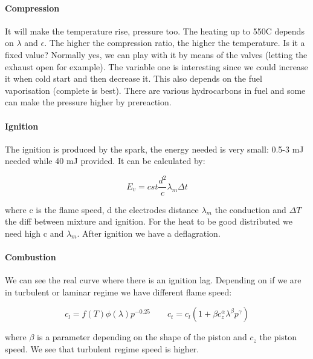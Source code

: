 \paragraph{Compression}
	It will make the temperature rise, pressure too. The heating up to 550\degres C depends on $\lambda$ and $\epsilon$. The higher the compression ratio, the higher the temperature. Is it a fixed value? Normally yes, we can play with it by means of the valves (letting the exhaust open for example). The variable one is interesting since we could increase it when cold start and then decrease it. This also depends on the fuel vaporisation (complete is best). There are various hydrocarbons in fuel and some can make the pressure higher by prereaction. 
	
\paragraph{Ignition}
	The ignition is produced by the spark, the energy needed is very small: 0.5-3 mJ needed while 40 mJ provided. It can be calculated by:

	\begin{equation}
	E _v = cst \frac{d^2}{c}\lambda _m \Delta t
\end{equation}		
	
	where c is the flame speed, d the electrodes distance $\lambda _m$ the conduction and $\Delta T$ the diff between mixture and ignition. For the heat to be good distributed we need high c and $\lambda _m$. After ignition we have a deflagration. 
	
\paragraph{Combustion}
	  We can see the real curve where there is an ignition lag. Depending on if we are in turbulent or laminar regime we have different flame speed: 
	  
	  \begin{equation}
	  c_l  = f(T)\phi (\lambda)p^{-0.25}\qquad c_t = c_l (1 + \beta c_z ^\alpha \lambda ^\beta p^\gamma)
	  \end{equation}
	
	where $\beta$ is a parameter depending on the shape of the piston and $c_z$ the piston speed. We see that turbulent regime speed is higher. 
	
	\ \\[1cm]
	
